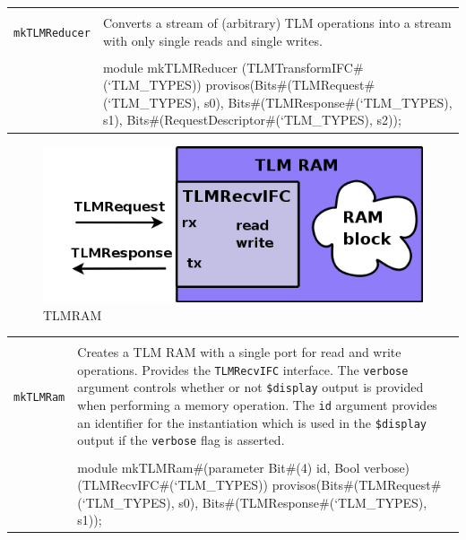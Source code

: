 \documentclass[twoside,letterpaper]{article}
\newcommand{\te}[1]{\texttt{#1}}
\newenvironment{libverbatim}
  {\vspace*{-1.0em}
   \verbatim}
  {\endverbatim
  }
\begin{document}
\begin{center}
\begin{tabular}{|p{1.2 in}|p{5 in}|}
\hline 
&\\
\te{mkTLMReducer}&Converts a stream of (arbitrary) TLM
operations into a stream with only single reads and single writes.\\
&\\
\cline{2-2}
&\begin{libverbatim}
module mkTLMReducer (TLMTransformIFC#(`TLM_TYPES))
   provisos(Bits#(TLMRequest#(`TLM_TYPES), s0),
            Bits#(TLMResponse#(`TLM_TYPES), s1),
            Bits#(RequestDescriptor#(`TLM_TYPES), s2));
\end{libverbatim}
\\
\hline
\end{tabular}
\end{center}

\begin{figure}[ht]
\begin{center}
\includegraphics[height = .8 in]{TLMRAM}
\caption{TLMRAM}
\label{ram}
\end{center}
\end{figure}

\begin{center}
\begin{tabular}{|p{1.2 in}|p{5 in}|}
\hline 
&\\
\te{mkTLMRam}&Creates a TLM RAM with a single port for read
and write operations.  Provides the \te{TLMRecvIFC} interface.  The
\te{verbose} argument controls whether or not \te{\$display} output
is provided when performing a memory operation. The \te{id} argument
provides an identifier for the instantiation which is used in the
\te{\$display} output if the \te{verbose} flag is asserted. \\ 
&\\
\cline{2-2}
&\begin{libverbatim}
module mkTLMRam#(parameter Bit#(4) id, Bool verbose) 
                (TLMRecvIFC#(`TLM_TYPES))
   provisos(Bits#(TLMRequest#(`TLM_TYPES),  s0),
            Bits#(TLMResponse#(`TLM_TYPES), s1));
\end{libverbatim}
\\
\hline
\end{tabular}
\end{center}
\end{document}
